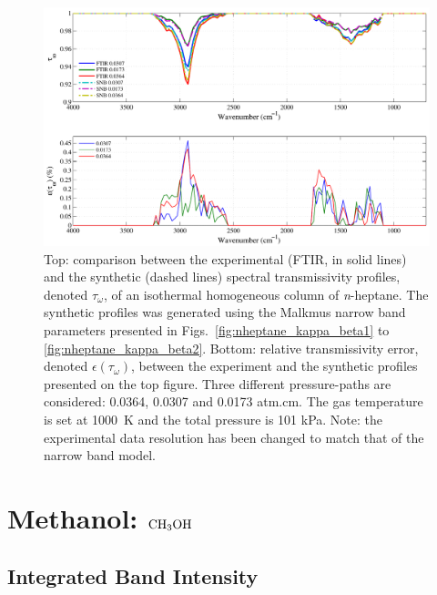 \begin{figure}[p]
\includegraphics[width=\textwidth]{Figures/Comparison_Fit_Heptane_MALKMUS_Temp1000K.pdf}
\caption{Top: comparison between the experimental (FTIR, in solid lines) and the synthetic (dashed lines) spectral transmissivity profiles, denoted $\tau_{\omega}$, of an isothermal homogeneous column of \textit{n}-heptane. The synthetic profiles was generated using the Malkmus narrow band parameters presented in Figs.~\ref{fig:nheptane_kappa_beta1} to \ref{fig:nheptane_kappa_beta2}. Bottom: relative transmissivity error, denoted $\epsilon{(\tau_{\omega})}$, between the experiment and the synthetic profiles presented on the top figure. Three different pressure-paths are considered: 0.0364, 0.0307 and 0.0173 atm.cm. The gas temperature is set at 1000~K and the total pressure is 101 kPa. Note: the experimental data resolution has been changed to match that of the narrow band model. \label{fig:nheptane_SNBVerify_1000K}}
\end{figure}


\clearpage

\section{Methanol: $\rm CH_3OH$}

\subsection{Integrated Band Intensity}

